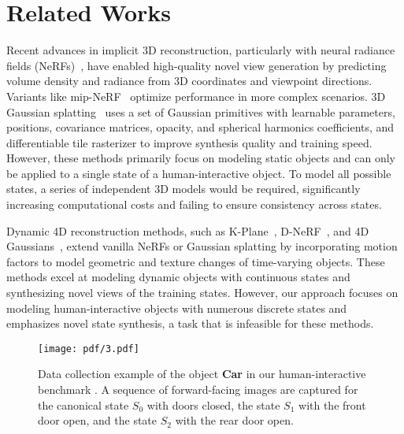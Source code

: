 \section{Related Works}
\label{sec:Related Work}
Recent advances in implicit 3D reconstruction, particularly with neural radiance fields (NeRFs)~\cite{nerf}, have enabled high-quality novel view generation by predicting volume density and radiance from 3D coordinates and viewpoint directions. Variants like mip-NeRF~\cite{mip360} optimize performance in more complex scenarios. 3D Gaussian splatting~\cite{3DGS} uses a set of Gaussian primitives with learnable parameters, \ie positions, covariance matrices, opacity, and spherical harmonics coefficients, and differentiable tile rasterizer to improve synthesis quality and training speed. However, these methods primarily focus on modeling static objects and can only be applied to a single state of a human-interactive object. To model all possible states, a series of independent 3D models would be required, significantly increasing computational costs and failing to ensure consistency across states.



Dynamic 4D reconstruction methods, such as K-Plane~\cite{kplane}, D-NeRF~\cite{dnerf}, and 4D Gaussians~\cite{4dgaussian}, extend vanilla NeRFs or Gaussian splatting by incorporating motion factors to model geometric and texture changes of time-varying objects. 
These methods excel at modeling dynamic objects with continuous states and synthesizing novel views of the training states. However, our approach focuses on modeling human-interactive objects with numerous discrete states and emphasizes novel state synthesis, a task that is infeasible for these methods.




\begin{figure}[!t]
 \centering
  \texttt{[image: pdf/3.pdf]}
   \vspace{-4mm}
    \caption{Data collection example of the object \textbf{Car} in our human-interactive benchmark \textit{\name{}}. A sequence of forward-facing images are captured for the canonical state $S_0$ with doors closed, the state $S_1$ with the front door open, and the state $S_2$ with the rear door open.}
  \label{fig:3}
  \vspace{-4mm}
\end{figure}